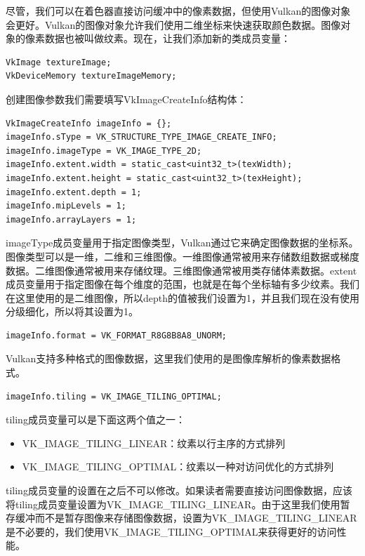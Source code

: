 \documentclass{ctexart}
\begin{document}
尽管，我们可以在着色器直接访问缓冲中的像素数据，但使用Vulkan的图像对象会更好。Vulkan的图像对象允许我们使用二维坐标来快速获取颜色数据。图像对象的像素数据也被叫做纹素。现在，让我们添加新的类成员变量：

\begin{lstlisting}[language={[ANSI]C}]
VkImage textureImage;
VkDeviceMemory textureImageMemory;
\end{lstlisting}

创建图像参数我们需要填写VkImageCreateInfo结构体：

\begin{lstlisting}[language={[ANSI]C}]
VkImageCreateInfo imageInfo = {};
imageInfo.sType = VK_STRUCTURE_TYPE_IMAGE_CREATE_INFO;
imageInfo.imageType = VK_IMAGE_TYPE_2D;
imageInfo.extent.width = static_cast<uint32_t>(texWidth);
imageInfo.extent.height = static_cast<uint32_t>(texHeight);
imageInfo.extent.depth = 1;
imageInfo.mipLevels = 1;
imageInfo.arrayLayers = 1;
\end{lstlisting}

imageType成员变量用于指定图像类型，Vulkan通过它来确定图像数据的坐标系。图像类型可以是一维，二维和三维图像。一维图像通常被用来存储数组数据或梯度数据。二维图像通常被用来存储纹理。三维图像通常被用类存储体素数据。extent成员变量用于指定图像在每个维度的范围，也就是在每个坐标轴有多少纹素。我们在这里使用的是二维图像，所以depth的值被我们设置为1，并且我们现在没有使用分级细化，所以将其设置为1。

\begin{lstlisting}[language={[ANSI]C}]
imageInfo.format = VK_FORMAT_R8G8B8A8_UNORM;
\end{lstlisting}

Vulkan支持多种格式的图像数据，这里我们使用的是图像库解析的像素数据格式。

\begin{lstlisting}[language={[ANSI]C}]
imageInfo.tiling = VK_IMAGE_TILING_OPTIMAL;
\end{lstlisting}

tiling成员变量可以是下面这两个值之一：

\begin{itemize}
	\item VK\_IMAGE\_TILING\_LINEAR：纹素以行主序的方式排列
	\item VK\_IMAGE\_TILING\_OPTIMAL：纹素以一种对访问优化的方式排列
\end{itemize}

tiling成员变量的设置在之后不可以修改。如果读者需要直接访问图像数据，应该将tiling成员变量设置为VK\_IMAGE\_TILING\_LINEAR。由于这里我们使用暂存缓冲而不是暂存图像来存储图像数据，设置为VK\_IMAGE\_TILING\_LINEAR是不必要的，我们使用VK\_IMAGE\_TILING\_OPTIMAL来获得更好的访问性能。
\end{document}
